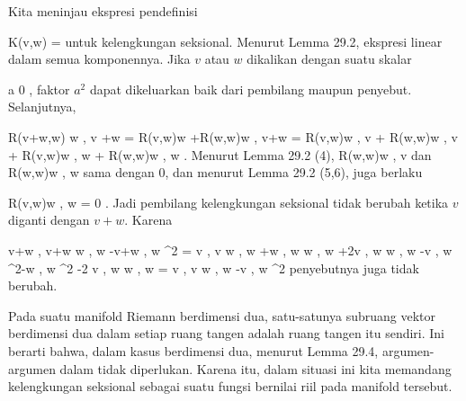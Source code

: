 {

Kita meninjau ekspresi pendefinisi

\mavergleichskettedisp
{\vergleichskette
{ K(v,w)
}
{ =} { {  }
}
{ } {
}
{ } {
}
{ } {
}
}
{}{}{}
untuk kelengkungan seksional. Menurut
Lemma 29.2,
ekspresi
 linear dalam semua komponennya. Jika $v$ atau $w$ dikalikan dengan suatu skalar

\mavergleichskette
{\vergleichskette
{ a
}
{ \neq }{ 0
}
{  }{
}
{    }{
}
{   }{
}
}
{}{}{,}
faktor $a^2$ dapat dikeluarkan baik dari pembilang maupun penyebut. Selanjutnya,

\mavergleichskettealignhandlinks
{\vergleichskettealignhandlinks
{ \left\langle  R(v+w,w) w  , v +w   \right\rangle
}
{ =} { \left\langle  R(v,w)w +R(w,w)w  , v+w   \right\rangle
}
{ =} { \left\langle  R(v,w)w   , v   \right\rangle  +  \left\langle  R(w,w)w  ,  v   \right\rangle + \left\langle  R(v,w)w  ,  w   \right\rangle  +  \left\langle  R(w,w)w   , w   \right\rangle
}
{ } {
}
{ } {
}
}
{}
{}{.}
Menurut
Lemma 29.2 (4),
\mathkor {} {\left\langle  R(w,w)w  ,  v   \right\rangle} {dan} {\left\langle  R(w,w)w   , w   \right\rangle} {}
sama dengan $0$, dan menurut
Lemma 29.2 (5,6),
juga berlaku

\mavergleichskette
{\vergleichskette
{ \left\langle  R(v,w)w  ,  w   \right\rangle
}
{ = }{ 0
}
{  }{
}
{    }{
}
{   }{
}
}
{}{}{.}
Jadi pembilang kelengkungan seksional tidak berubah ketika $v$ diganti dengan $v+w$. Karena

\mavergleichskettealigndrucklinks
{\vergleichskettealigndrucklinks
{ \left\langle v+w , v+w  \right\rangle \left\langle  w  , w  \right\rangle -\left\langle v+w , w  \right\rangle^2
}
{ =} { \left\langle  v  , v  \right\rangle  \left\langle  w  , w  \right\rangle+\left\langle  w  , w  \right\rangle \left\langle  w  , w  \right\rangle +2\left\langle  v  , w  \right\rangle \left\langle  w  , w  \right\rangle -\left\langle v  , w  \right\rangle^2-\left\langle w  , w  \right\rangle^2 -2 \left\langle v  , w  \right\rangle \left\langle w  , w  \right\rangle
}
{ =} { \left\langle  v  , v  \right\rangle \left\langle  w  , w  \right\rangle -\left\langle v  , w  \right\rangle^2
}
{ } {
}
{ } {
}
}
{}{}{}
penyebutnya juga tidak berubah.

}

{}
{

Pada suatu manifold Riemann berdimensi dua, satu-satunya subruang vektor berdimensi dua dalam setiap ruang tangen adalah ruang tangen itu sendiri. Ini berarti bahwa, dalam kasus berdimensi dua, menurut
Lemma 29.4,
argumen-argumen dalam
tidak diperlukan. Karena itu, dalam situasi ini kita memandang kelengkungan seksional sebagai suatu fungsi bernilai riil pada manifold tersebut.

}



